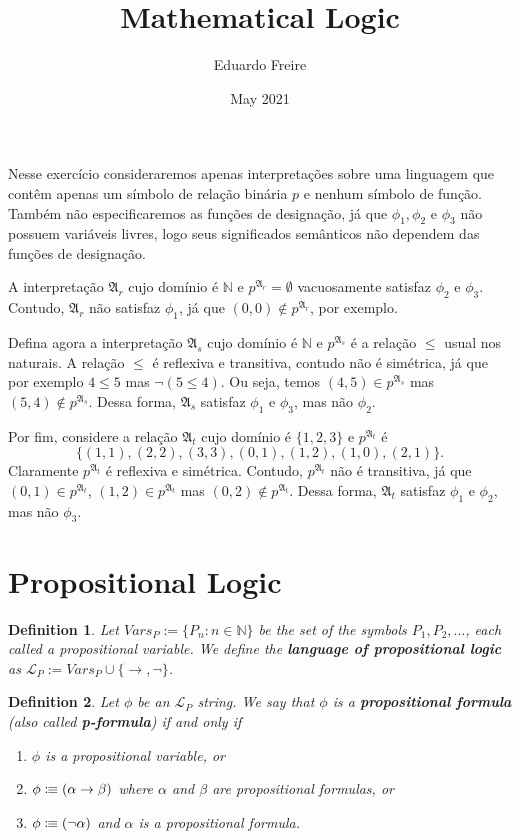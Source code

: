 \documentclass[leqno]{article}
\title{Mathematical Logic}
\author{Eduardo Freire}
\date{May 2021}
\newtheorem{definition}{Definition}[section]
\newcommand{\N}{\mathbb{N}}
\newcommand{\set}[1]{\{#1\}}
\newcommand{\lang}{\mathcal{L}}
\newcommand{\is}{\colonequiv}
\newcommand{\limplies}{\rightarrow}
\newcommand{\struct}[1]{\mathfrak{#1}}
\begin{document}
\maketitle
Nesse exercício consideraremos apenas interpretações sobre uma linguagem que
contêm apenas um símbolo de relação binária $p$ e nenhum símbolo de função. Também
não especificaremos as funções de designação, já que $\phi_1, \phi_2$ e $\phi_3$ não possuem variáveis livres, logo seus significados semânticos não dependem das funções de designação.

A interpretação $\struct{A}_r$ cujo domínio é $\N$ e $p^{\struct{A}_r} = \emptyset$ vacuosamente satisfaz $\phi_2$ e $\phi_3$.
Contudo, $\struct{A}_r$ não satisfaz $\phi_1$, já que $(0, 0) \notin p^{\struct{A}_r}$, por exemplo.

Defina agora a interpretação $\struct{A}_s$ cujo domínio é $\N$ e $p^{\struct{A}_s}$ é a relação $\leq$ usual nos naturais. A relação $\leq$ é reflexiva e transitiva, contudo não é simétrica, já que por exemplo $4 \leq 5$ mas $\neg (5 \leq 4)$. Ou seja, temos $(4, 5) \in p^{\struct{A}_s}$ mas $(5, 4) \notin p^{\struct{A}_s}$. Dessa forma, $\struct{A}_s$ satisfaz $\phi_1$ e $\phi_3$, mas não $\phi_2$.

Por fim, considere a relação $\struct{A}_t$ cujo domínio é $\set{1, 2, 3}$ e $p^{\struct{A}_t}$ é 
\begin{equation*}
    \set{(1, 1), (2, 2), (3, 3), (0, 1), (1, 2), (1, 0), (2, 1)}.
\end{equation*} Claramente $p^{\struct{A}_t}$ é reflexiva e simétrica. Contudo, $p^{\struct{A}_t}$ não é transitiva, já que $(0, 1) \in p^{\struct{A}_t}$, $(1, 2) \in p^{\struct{A}_t}$ mas $(0, 2) \notin p^{\struct{A}_t}$. Dessa forma, $\struct{A}_t$ satisfaz $\phi_1$ e $\phi_2$, mas não $\phi_3$.

\section{Propositional Logic}
\begin{definition}
    Let $Vars_P := \set{P_n: n \in \N}$  be the set of the symbols $P_1, P_2, \dots $, each called a propositional variable. We define the \textbf{language of propositional logic} as $\lang_P := Vars_P \cup \set{\limplies, \neg}$.
\end{definition}

\begin{definition}
    Let $\phi$ be an $\lang_P$ string. We say that $\phi$ is a \textbf{propositional formula} (also called \textbf{p-formula}) if and only if
    
    \begin{enumerate}
        \item $\phi$ is a propositional variable, or
        \item $\phi \is (\alpha \limplies \beta)$ where $\alpha$ and $\beta$ are propositional formulas, or
        \item $\phi \is (\neg \alpha)$ and $\alpha$ is a propositional formula.
    \end{enumerate}
\end{definition}
\end{document}
